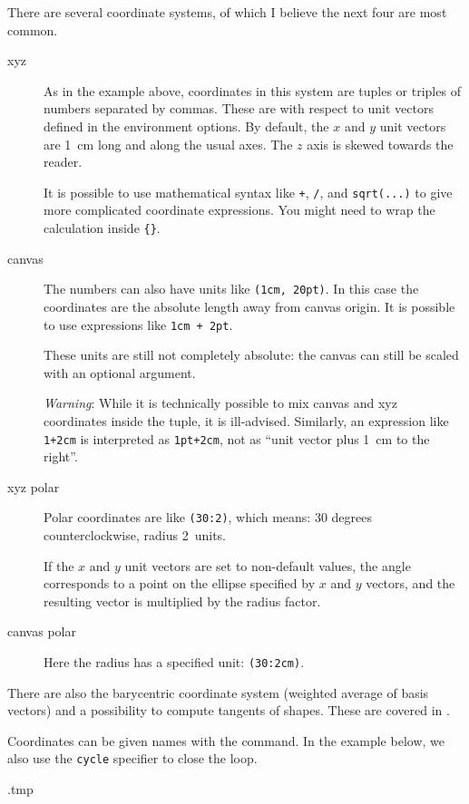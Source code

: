 There are several coordinate systems, of which I believe the next four are most common.
\begin{description}
\item[xyz] As in the example above, coordinates in this system are
    tuples or triples of numbers separated by commas.
    These are with respect to unit vectors defined in the environment options.
    By default, the $x$ and $y$ unit vectors are 1~cm long and along the usual axes.
    The $z$ axis is skewed towards the reader.

    It is possible to use mathematical syntax like \verb|+|, \verb|/|, and \verb|sqrt(...)|
    to give more complicated coordinate expressions.
    You might need to wrap the calculation inside \verb|{}|.

\item[canvas] The numbers can also have units like \verb|(1cm, 20pt)|.
    In this case the coordinates are the absolute length away from canvas origin.
    It is possible to use expressions like \verb|1cm + 2pt|.
    
    These units are still not completely absolute:
    the canvas can still be scaled with an optional argument.

    \emph{Warning}: While it is technically possible to mix canvas and xyz coordinates
    inside the tuple, it is ill-advised.
    Similarly, an expression like \verb|1+2cm| is interpreted as \verb|1pt+2cm|,
    not as ``unit vector plus 1~cm to the right''.

\item[xyz polar] Polar coordinates are like \verb|(30:2)|,
    which means: 30 degrees counterclockwise, radius 2~units.

    If the $x$ and $y$ unit vectors are set to non-default values,
    the angle corresponds to a point on the ellipse specified by $x$ and $y$ vectors,
    and the resulting vector is multiplied by the radius factor.

\item[canvas polar] Here the radius has a specified unit: \verb|(30:2cm)|.
\end{description}

There are also the barycentric coordinate system (weighted average of basis vectors)
and a possibility to compute tangents of shapes.
These are covered in \cite[Section~13.2]{tikz}.

Coordinates can be given names with the  command.
In the example below, we also use the \verb|cycle| specifier to close the loop.
%
\begin{VerbatimOut}{\jobname.tmp}
\end{VerbatimOut}
\ShowExample

